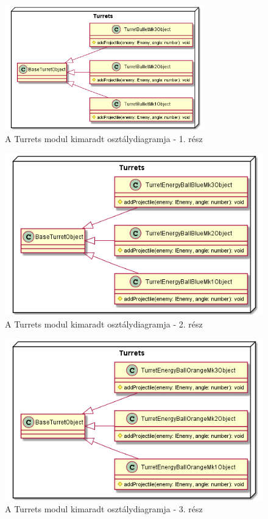 \begin{figure}[h!]
	\centering
	\includegraphics[width=0.773\textwidth]{kepek/uml/turrets/turret-pt2.png}
	\caption{A Turrets modul kimaradt osztálydiagramja - 1. rész}
	\label{fig:uml:turret-pt2}
\end{figure}

\begin{figure}[h!]
	\centering
	\includegraphics[width=1\textwidth]{kepek/uml/turrets/turret-pt3.png}
	\caption{A Turrets modul kimaradt osztálydiagramja - 2. rész}
	\label{fig:uml:turret-pt3}
\end{figure}

\begin{figure}[h!]
	\centering
	\includegraphics[width=1\textwidth]{kepek/uml/turrets/turret-pt4.png}
	\caption{A Turrets modul kimaradt osztálydiagramja - 3. rész}
	\label{fig:uml:turret-pt4}
\end{figure}

